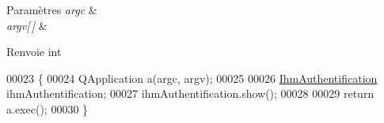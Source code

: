 \begin{DoxyParams}{Paramètres}
{\em argc} & \\
\hline
{\em argv\mbox{[}$\,$\mbox{]}} & \\
\hline
\end{DoxyParams}
\begin{DoxyReturn}{Renvoie}
int 
\end{DoxyReturn}

\begin{DoxyCode}
00023 \{
00024     QApplication a(argc, argv);
00025 
00026     \hyperlink{class_ihm_authentification}{IhmAuthentification} ihmAuthentification;
00027     ihmAuthentification.show();
00028 
00029     \textcolor{keywordflow}{return} a.exec();
00030 \}
\end{DoxyCode}
